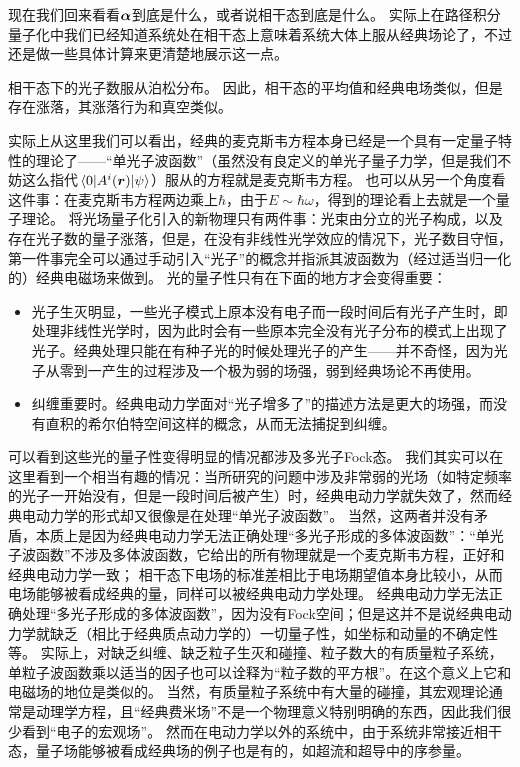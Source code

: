 现在我们回来看看$\vb*{\alpha}$到底是什么，或者说相干态到底是什么。
实际上在路径积分量子化中我们已经知道系统处在相干态上意味着系统大体上服从经典场论了，不过还是做一些具体计算来更清楚地展示这一点。

相干态下的光子数服从泊松分布。
因此，相干态的平均值和经典电场类似，但是存在涨落，其涨落行为和真空类似。



实际上从这里我们可以看出，经典的麦克斯韦方程本身已经是一个具有一定量子特性的理论了——“单光子波函数”（虽然没有良定义的单光子量子力学，但是我们不妨这么指代$\mel*{0}{A^i(\vb*{r})}{\psi}$）服从的方程就是麦克斯韦方程。
也可以从另一个角度看这件事：在麦克斯韦方程两边乘上$\hbar$，由于$E \sim \hbar \omega$，得到的理论看上去就是一个量子理论。
将光场量子化引入的新物理只有两件事：光束由分立的光子构成，以及存在光子数的量子涨落，但是，在没有非线性光学效应的情况下，光子数目守恒，第一件事完全可以通过手动引入“光子”的概念并指派其波函数为（经过适当归一化的）经典电磁场来做到。
光的量子性只有在下面的地方才会变得重要：
\begin{itemize}
    \item 光子生灭明显，一些光子模式上原本没有电子而一段时间后有光子产生时，即处理非线性光学时，因为此时会有一些原本完全没有光子分布的模式上出现了光子。经典处理只能在有种子光的时候处理光子的产生——并不奇怪，因为光子从零到一产生的过程涉及一个极为弱的场强，弱到经典场论不再使用。
    \item 纠缠重要时。经典电动力学面对“光子增多了”的描述方法是更大的场强，而没有直积的希尔伯特空间这样的概念，从而无法捕捉到纠缠。
\end{itemize}
可以看到这些光的量子性变得明显的情况都涉及多光子Fock态。
我们其实可以在这里看到一个相当有趣的情况：当所研究的问题中涉及非常弱的光场（如特定频率的光子一开始没有，但是一段时间后被产生）时，经典电动力学就失效了，然而经典电动力学的形式却又很像是在处理“单光子波函数”。
当然，这两者并没有矛盾，本质上是因为经典电动力学无法正确处理“多光子形成的多体波函数”：“单光子波函数”不涉及多体波函数，它给出的所有物理就是一个麦克斯韦方程，正好和经典电动力学一致；
相干态下电场的标准差相比于电场期望值本身比较小，从而电场能够被看成经典的量，同样可以被经典电动力学处理。
经典电动力学无法正确处理“多光子形成的多体波函数”，因为没有Fock空间；但是这并不是说经典电动力学就缺乏（相比于经典质点动力学的）一切量子性，如坐标和动量的不确定性等。
实际上，对缺乏纠缠、缺乏粒子生灭和碰撞、粒子数大的有质量粒子系统，单粒子波函数乘以适当的因子也可以诠释为“粒子数的平方根”。在这个意义上它和电磁场的地位是类似的。
当然，有质量粒子系统中有大量的碰撞，其宏观理论通常是动理学方程，且“经典费米场”不是一个物理意义特别明确的东西，因此我们很少看到“电子的宏观场”。
然而在电动力学以外的系统中，由于系统非常接近相干态，量子场能够被看成经典场的例子也是有的，如超流和超导中的序参量。

